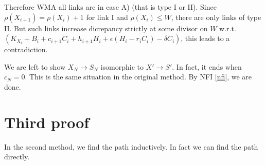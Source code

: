 \documentclass{article}
\begin{document}
Therefore WMA all links are in case A) (that is type I or II). Since $ \rho(X_{i+1})=\rho(X_i)+1 $ for link I and $ \rho(X_i)\leqslant W $, there are only links of type II. But such links increase dicrepancy strictly at some divisor on $ W $ w.r.t. $ (K_{X_i}+B_i+c_{i+1}C_i+h_{i+1}H_i+\epsilon(H_i-r_iC_i)-\delta C_i) $, this leads to a contradiction.

We are left to show $ X_N\to S_N $ isomorphic to $ X'\to S' $. In fact, it ends when $ c_N=0 $. This is the same situation in the original method. By NFI \ref{nfi}, we are done.
\section{Third proof}

In the second method, we find the path inductively. In fact we can find the path directly. 
\end{document}
